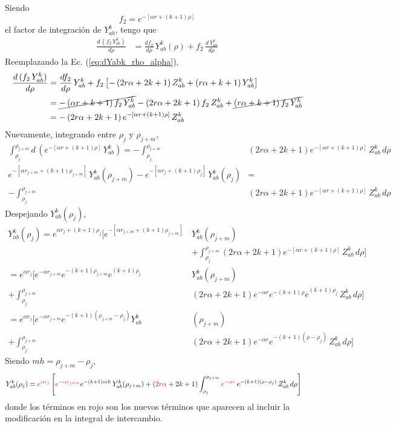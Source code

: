 \documentclass[11pt]{article}
\begin{document}
\vspace{0.25cm}
Siendo 
\begin{equation}
 f_2=e^{-[\alpha r + (k+1)\rho]}
\end{equation}
el factor de integración de $Y_{ab}^k$, tengo que
\begin{align}
 \frac{d\,(f_2\,Y_{ab}^k)}{d\rho}
 &=\frac{df_2}{d\rho}\, Y_{ab}^k(\rho) + f_2 \,\frac{d\,Y_{ab}^k}{d\rho} 
\end{align}
Reemplazando la Ec. (\ref{eq:dYabk_rho_alpha}),
\begin{align}
 \frac{d\,(f_2\,Y_{ab}^k)}{d\rho}
 &=\frac{df_2}{d\rho}\, Y_{ab}^k
 + f_2 \left[-\left(2r\alpha+2k+1\right)Z_{ab}^k+\left(r\alpha+k+1\right)Y_{ab}^k \right] \\
 &=\cancel{-\left(\alpha r +k+1\right)f_2\, Y_{ab}^k}
 - \left(2r\alpha+2k+1\right)f_2 \,Z_{ab}^k
 +\cancel{\left(r\alpha+k+1\right)f_2\,Y_{ab}^k} \\
 &=-\left(2r\alpha+2k+1\right) e^{-[\alpha r + (k+1)\rho]} \,Z_{ab}^k
\end{align}
Nuevamente, integrando entre $\rho_j$ y $\rho_{j+m}$,
\begin{align}
 \int_{\rho_j}^{\rho_{j+m}} 
 d\,(e^{-[\alpha r + (k+1)\rho]}\,Y_{ab}^k)
 = -\int_{\rho_j}^{\rho_{j+m}}& \left(2r\alpha+2k+1\right) e^{-[\alpha r + (k+1)\rho]} \,Z_{ab}^k\, d\rho \\
 e^{-[\alpha r_{j+m} + (k+1)\rho_{j+m}]}\,Y_{ab}^k(\rho_{j+m})-e^{-[\alpha r_j + (k+1)\rho_j]}\,Y_{ab}^k(\rho_j) \nonumber
 &= \\ -\int_{\rho_j}^{\rho_{j+m}} & \left(2r\alpha+2k+1\right) e^{-[\alpha r + (k+1)\rho]} \,Z_{ab}^k\, d\rho 
\end{align}
Despejando $Y_{ab}^k(\rho_j)$,
\begin{align}
 Y_{ab}^k(\rho_j)
 =e^{\alpha r_j + (k+1)\rho_j}\Bigg[ e^{-[\alpha r_{j+m} + (k+1)\rho_{j+m}]}\,& Y_{ab}^k(\rho_{j+m}) \nonumber \\ 
 & +\int_{\rho_j}^{\rho_{j+m}} \left(2r\alpha+2k+1\right) e^{-[\alpha r + (k+1)\rho]} \,Z_{ab}^k\, d\rho \Bigg] \\
 =e^{\alpha r_j}\Bigg[ e^{-\alpha r_{j+m}}e^{-(k+1)\rho_{j+m}} e^{(k+1)\rho_j} & Y_{ab}^k(\rho_{j+m}) \nonumber \\ 
 + \int_{\rho_j}^{\rho_{j+m}} & \left(2r\alpha+2k+1\right) e^{-\alpha r}e^{-(k+1)\rho} e^{(k+1)\rho_j}\,Z_{ab}^k\, d\rho \Bigg] \\
 = e^{\alpha r_j}\Bigg[ e^{-\alpha r_{j+m}}e^{-(k+1)(\rho_{j+m}-\rho_j)} Y_{ab}^k&(\rho_{j+m}) \nonumber \\ 
 + \int_{\rho_j}^{\rho_{j+m}} & \left(2r\alpha+2k+1\right) e^{-\alpha r}e^{-(k+1)(\rho-\rho_j)}\,Z_{ab}^k\, d\rho \Bigg] 
\end{align}
Siendo $mh=\rho_{j+m}-\rho_j$,
\begin{align}
 Y_{ab}^k(\rho_j)&={\color{red}e^{\alpha r_j}} \left[ {\color{red} e^{-\alpha r_{j+m}}}e^{-(k+1)mh}\,Y_{ab}^k(\rho_{j+m}) + \left({\color{red}2r\alpha}+2k+1\right) \int_{\rho_j}^{\rho_{j+m}} {\color{red}e^{-\alpha r}}\,e^{-(k+1)(\rho-\rho_j)}\,Z_{ab}^k\, d\rho \right]
\end{align}
donde los términos en rojo son los nuevos términos que aparecen 
al incluir la modificación en la integral de intercambio.
\end{document}
